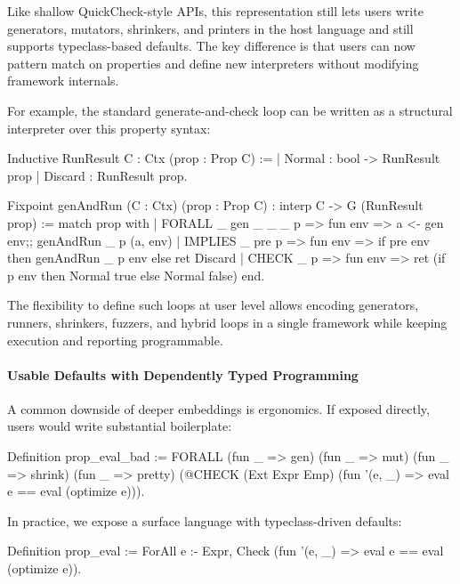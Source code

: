 Like shallow QuickCheck-style APIs, this representation still lets users write
generators, mutators, shrinkers, and printers in the host language and still supports
typeclass-based defaults. The key difference is that users can now pattern match on
properties and define new interpreters without modifying framework internals.

For example, the standard generate-and-check loop can be written as a structural
interpreter over this property syntax:

\begin{code}[language=Rocq]
Inductive RunResult {C : Ctx} (prop : Prop C) :=
| Normal : bool -> RunResult prop
| Discard : RunResult prop.
\end{code}

\begin{code}[language=Rocq]
Fixpoint genAndRun (C : Ctx) (prop : Prop C) : interp C -> G (RunResult prop) :=
  match prop with
  | FORALL _ gen _ _ _ p =>
      fun env =>
        a <- gen env;;
        genAndRun _ p (a, env)
  | IMPLIES _ pre p =>
      fun env =>
        if pre env then genAndRun _ p env else ret Discard
  | CHECK _ p =>
      fun env =>
        ret (if p env then Normal true else Normal false)
  end.
\end{code}

The flexibility to define such loops at user level allows encoding generators, runners,
shrinkers, fuzzers, and hybrid loops in a single framework while keeping execution and
reporting programmable.

\paragraph*{Usable Defaults with Dependently Typed Programming}

A common downside of deeper embeddings is ergonomics. If exposed directly, users would
write substantial boilerplate:

\begin{code}[language=Rocq]
Definition prop_eval_bad :=
  FORALL (fun _ => gen) (fun _ => mut)
         (fun _ => shrink) (fun _ => pretty)
         (@CHECK (Ext Expr Emp) (fun '(e, _) => eval e == eval (optimize e))).
\end{code}

In practice, we expose a surface language with typeclass-driven defaults:

\begin{code}[language=Rocq]
Definition prop_eval :=
  ForAll e :- Expr,
  Check (fun '(e, _) => eval e == eval (optimize e)).
\end{code}

